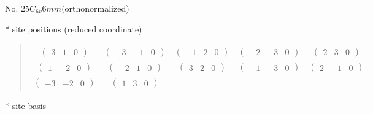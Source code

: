 \documentclass[fleqn,9pt,landscape]{jsarticle}
\begin{document}
\newpage
\begin{center}
\LARGE
No. 25\quad$C_{6v}$\quad$6mm$\quad[ hexagonal ] (orthonormalized)
\end{center}
\vspace{5mm}
* site positions (reduced coordinate)
\begin{quote}
\begin{tabular}{ccccc}
$ \begin{pmatrix} 3 & 1 & 0 \end{pmatrix} $ & $ \begin{pmatrix} -3 & -1 & 0 \end{pmatrix} $ & $ \begin{pmatrix} -1 & 2 & 0 \end{pmatrix} $ & $ \begin{pmatrix} -2 & -3 & 0 \end{pmatrix} $ & $ \begin{pmatrix} 2 & 3 & 0 \end{pmatrix} $ \\
$ \begin{pmatrix} 1 & -2 & 0 \end{pmatrix} $ & $ \begin{pmatrix} -2 & 1 & 0 \end{pmatrix} $ & $ \begin{pmatrix} 3 & 2 & 0 \end{pmatrix} $ & $ \begin{pmatrix} -1 & -3 & 0 \end{pmatrix} $ & $ \begin{pmatrix} 2 & -1 & 0 \end{pmatrix} $ \\
$ \begin{pmatrix} -3 & -2 & 0 \end{pmatrix} $ & $ \begin{pmatrix} 1 & 3 & 0 \end{pmatrix} $ & $  $ & $  $ & $  $
\end{tabular}
\end{quote}
* site basis
\end{document}
